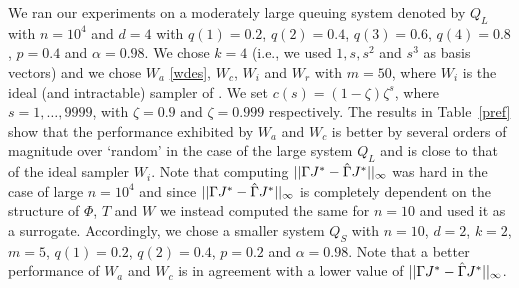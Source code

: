 We ran our experiments on a moderately large queuing system denoted by $Q_L$ with $n=10^4$ and $d=4$ with $q(1)=0.2$, $q(2)=0.4$, $q(3)=0.6$, $q(4)=0.8$, $p=0.4$ and $\alpha=0.98$. We chose $k=4$ (i.e., we used $1, s,s^2$ and $s^3$ as basis vectors) and we chose $W_a$ \eqref{wdes}, $W_c$, $W_i$ and $W_r$ with $m=50$, where $W_i$ is the ideal
(and intractable) sampler of \citep{CS}.
We set $c(s)=(1-\zeta) \zeta^s$, where $s=1,\ldots,9999$, with $\zeta=0.9$ and $\zeta=0.999$ respectively. The results in Table~\ref{pref} show that the performance exhibited by $W_a$ and $W_c$ is better by several orders of magnitude over `random' in the case of the large system $Q_L$ and is close to that of the ideal sampler $W_i$. Note that computing $||\Gamma J^*-\hat{\Gamma} J^*||_\infty$ was hard in the case of large $n=10^4$ and since $||\Gamma J^*-\hat{\Gamma} J^*||_\infty$ is completely dependent on the structure of $\Phi$, $T$ and $W$ we instead computed the same for $n=10$ and used it as a surrogate. Accordingly, we chose a smaller system $Q_S$ with $n=10$, $d=2$, $k=2$, $m=5$, $q(1)=0.2$, $q(2)=0.4$, $p=0.2$ and $\alpha=0.98$. Note that a better performance of $W_a$ and $W_c$ is in agreement with a lower value of $||\Gamma J^*-\hat{\Gamma} J^*||_\infty$.
\FloatBarrier
\begin{table}[H]
\begin{center}
\end{center}
\caption{Shows values of Error Terms for $Q_L$.}
\label{pref}
\end{table}
